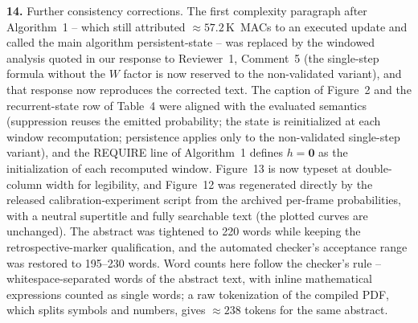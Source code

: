 \documentclass[1p,12pt,authoryear]{elsarticle}
\providecommand{\revcolor}{black}%
\begin{document}
\vspace{2mm}
\noindent \textbf{14.} Further consistency corrections. The first complexity paragraph after Algorithm~1 -- which still attributed ${\approx}57.2$\,K~MACs to an executed update and called the main algorithm persistent-state -- was replaced by the windowed analysis quoted in our response to Reviewer~1, Comment~5 (the single-step formula without the $W$ factor is now reserved to the non-validated variant), and that response now reproduces the corrected text. The caption of Figure~2 and the recurrent-state row of Table~4 were aligned with the evaluated semantics (suppression reuses the emitted probability; the state is reinitialized at each window recomputation; persistence applies only to the non-validated single-step variant), and the REQUIRE line of Algorithm~1 defines $h{=}\mathbf{0}$ as the initialization of each recomputed window. Figure~13 is now typeset at double-column width for legibility, and Figure~12 was regenerated directly by the released calibration-experiment script from the archived per-frame probabilities, with a neutral supertitle and fully searchable text (the plotted curves are unchanged). The abstract was tightened to 220 words while keeping the retrospective-marker qualification, and the automated checker's acceptance range was restored to 195--230 words. {\color{\revcolor}Word counts here follow the checker's rule -- whitespace-separated words of the abstract text, with inline mathematical expressions counted as single words; a raw tokenization of the compiled PDF, which splits symbols and numbers, gives ${\approx}238$ tokens for the same abstract.}
\end{document}
